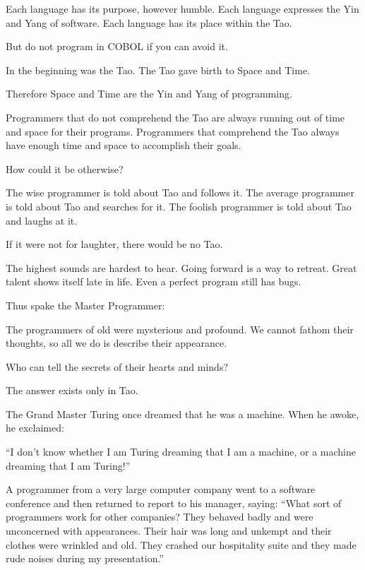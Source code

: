 Each language has its purpose, however humble. Each language expresses the Yin and Yang of software. Each language has its place within the Tao.

But do not program in COBOL if you can avoid it.

In the beginning was the Tao. The Tao gave birth to Space and Time.

Therefore Space and Time are the Yin and Yang of programming.

Programmers that do not comprehend the Tao are always running out of time and space for their programs. Programmers that comprehend the Tao always have enough time and space to accomplish their goals.

How could it be otherwise?

The wise programmer is told about Tao and follows it. The average programmer is told about Tao and searches for it. The foolish programmer is told about Tao and laughs at it.

If it were not for laughter, there would be no Tao.

The highest sounds are hardest to hear. Going forward is a way to retreat. Great talent shows itself late in life. Even a perfect program still has bugs.

Thus spake the Master Programmer:

The programmers of old were mysterious and profound. We cannot fathom their thoughts, so all we do is describe their appearance.


Who can tell the secrets of their hearts and minds?

The answer exists only in Tao.

The Grand Master Turing once dreamed that he was a machine. When he awoke, he exclaimed:

``I don't know whether I am Turing dreaming that I am a machine, or a machine dreaming that I am Turing!''

A programmer from a very large computer company went to a software conference and then returned to report to his manager, saying: ``What sort of programmers work for other companies? They behaved badly and were unconcerned with appearances. Their hair was long and unkempt and their clothes were wrinkled and old. They crashed our hospitality suite and they made rude noises during my presentation.''

